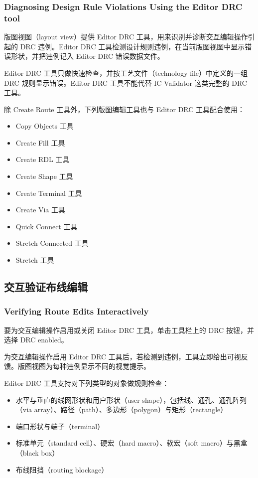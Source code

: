 \subsubsection*{Diagnosing Design Rule Violations Using the Editor DRC tool}
\label{sec:gui-editor-drc}

版图视图（layout view）提供 Editor DRC 工具，用来识别并诊断交互编辑操作引起的 DRC 违例。Editor DRC 工具检测设计规则违例，在当前版图视图中显示错误形状，并把违例记入 Editor DRC 错误数据文件。

\begin{noteBox}
Editor DRC 工具只做快速检查，并按工艺文件（technology file）中定义的一组 DRC 规则显示错误。Editor DRC 工具不能代替 IC Validator 这类完整的 DRC 工具。
\end{noteBox}

除 Create Route 工具外，下列版图编辑工具也与 Editor DRC 工具配合使用：
\begin{itemize}
  \item Copy Objects 工具
  \item Create Fill 工具
  \item Create RDL 工具
  \item Create Shape 工具
  \item Create Terminal 工具
  \item Create Via 工具
  \item Quick Connect 工具
  \item Stretch Connected 工具
  \item Stretch 工具
\end{itemize}

\subsection{交互验证布线编辑}
\subsubsection*{Verifying Route Edits Interactively}

要为交互编辑操作启用或关闭 Editor DRC 工具，单击工具栏上的 DRC 按钮，并选择 DRC enabled。

为交互编辑操作启用 Editor DRC 工具后，若检测到违例，工具立即给出可视反馈。版图视图为每种违例显示不同的视觉提示。

Editor DRC 工具支持对下列类型的对象做规则检查：
\begin{itemize}
  \item 水平与垂直的线网形状和用户形状（user shape），包括线、通孔、通孔阵列（via array）、路径（path）、多边形（polygon）与矩形（rectangle）
  \item 端口形状与端子（terminal）
  \item 标准单元（standard cell）、硬宏（hard macro）、软宏（soft macro）与黑盒（black box）
  \item 布线阻挡（routing blockage）
\end{itemize}

